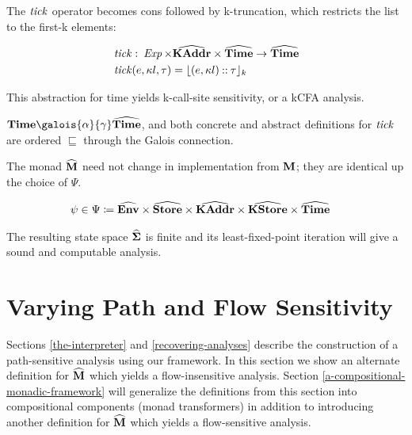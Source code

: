 The $ \operatorname{\mathit{tick}} $ operator becomes cons followed by k-truncation,
which restricts the list to the first-k elements:

\small\begin{align*}
&\hspace{0em}  \operatorname{\mathit{tick}}   \mathbin{\colon}   \operatorname{\mathit{Exp}}   \times   \widehat{\mathtt{\mathbf{KAddr}}}   \times   \widehat{\mathtt{\mathbf{Time}}}   \rightarrow   \widehat{\mathtt{\mathbf{Time}}}  \\
&\hspace{0em}  \operatorname{\mathit{tick}}( e, \kappa l, \tau ) =  \lfloor (e, \kappa l) \mathbin{::}  \tau  \rfloor  _k 
\end{align*}\normalsize

This abstraction for time yields k-call-site sensitivity, or a kCFA
analysis. \begin{proposition}
$ \Concrete{\litTime}   \galois{\alpha}{\gamma}   \Abstract{\litTime} $,
and both concrete and abstract definitions for $ \operatorname{\mathit{tick}} $ are
ordered $ \sqsubseteq $ through the Galois connection. \end{proposition}

\par

The monad $ \widehat{\mathtt{\mathbf{M}}} $ need not change in implementation from
$ \mathtt{\mathbf{M}} $; they are identical up the choice of $ \Psi $.

\small\begin{align*}
&\hspace{0em}  \psi   \in   \Psi   \coloneqq   \widehat{\mathtt{\mathbf{Env}}}   \times   \widehat{\mathtt{\mathbf{Store}}}   \times   \widehat{\mathtt{\mathbf{KAddr}}}   \times   \widehat{\mathtt{\mathbf{KStore}}}   \times   \widehat{\mathtt{\mathbf{Time}}} 
\end{align*}\normalsize

The resulting state space $ \widehat{\mathtt{\mathbf{\Sigma}}} $ is finite and its
least-fixed-point iteration will give a sound and computable analysis.

\par

\section{Varying Path and Flow
Sensitivity}\label{varying-path-and-flow-sensitivity}

\par

Sections \ref{the-interpreter} and \ref{recovering-analyses} describe
the construction of a path-sensitive analysis using our framework. In
this section we show an alternate definition for $ \widehat{\mathtt{\mathbf{M}}} $
which yields a flow-insensitive analysis. Section
\ref{a-compositional-monadic-framework} will generalize the definitions
from this section into compositional components (monad transformers) in
addition to introducing another definition for $ \widehat{\mathtt{\mathbf{M}}} $
which yields a flow-sensitive analysis.

